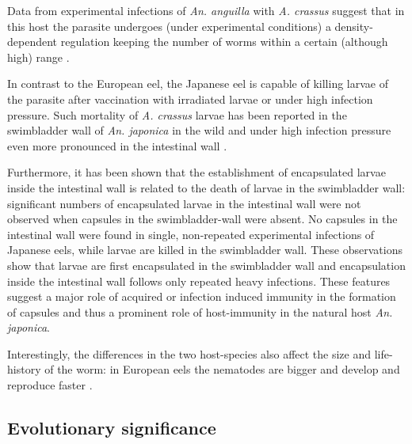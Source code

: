 Data from experimental infections of \textit{An. anguilla} with
\textit{A. crassus} suggest that in this host the parasite undergoes
(under experimental conditions) a density-dependent regulation keeping
the number of worms within a certain (although high) range
\cite{fazio_regulation_2008}.

In contrast to the European eel, the Japanese eel is capable of
killing larvae of the parasite after vaccination with irradiated
larvae \cite{knopf_vaccination_2008} or under high infection pressure.
Such mortality of \textit{A. crassus} larvae has been reported in the
swimbladder wall of \textit{An. japonica} in the wild
\cite{mnderle_occurrence_2006} and under high infection pressure even
more pronounced in the intestinal wall \cite{heitlinger_massive_2009}.

Furthermore, it has been shown that the establishment of encapsulated
larvae inside the intestinal wall is related to the death of larvae in
the swimbladder wall: significant numbers of encapsulated larvae in
the intestinal wall were not observed when capsules in the
swimbladder-wall were absent. No capsules in the intestinal wall were
found in single, non-repeated experimental infections of Japanese
eels, while larvae are killed in the swimbladder wall. These
observations show that larvae are first encapsulated in the
swimbladder wall and encapsulation inside the intestinal wall follows
only repeated heavy infections. These features suggest a major role of
acquired or infection induced immunity in the formation of capsules
\cite{heitlinger_massive_2009} and thus a prominent role of
host-immunity in the natural host \textit{An. japonica}.

Interestingly, the differences in the two host-species also affect the
size and life-history of the worm: in European eels the nematodes are
bigger and develop and reproduce faster \cite{knopf_differences_2004}.


\subsection{Evolutionary significance}
\label{ev-sig}

